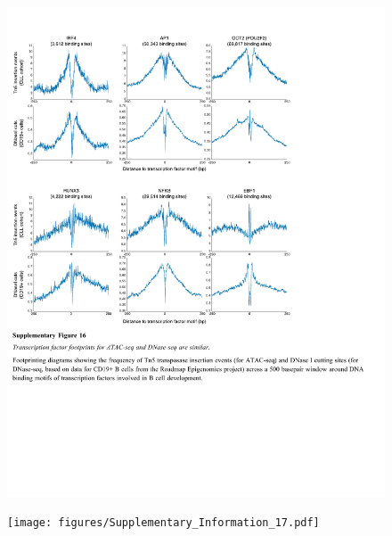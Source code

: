 \documentclass[10pt,]{article}
\begin{document}
\begin{figure}
\centering
\includegraphics[width=1.000\hsize]{figures/Supplementary_Information_16.pdf}
\end{figure}
\clearpage

\begin{figure}
\centering
\texttt{[image: figures/Supplementary\_Information\_17.pdf]}
\end{figure}
\clearpage
\end{document}
